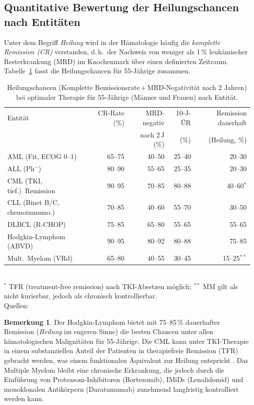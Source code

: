 ﻿\documentclass[12pt,a4paper]{article}
\theoremstyle{definition}
\newtheorem{remark}[theorem]{Bemerkung}
\begin{document}
\subsection{Quantitative Bewertung der Heilungschancen nach Entitäten}

Unter dem Begriff \emph{Heilung} wird in der Hämatologie häufig die
\emph{komplette Remission (CR)} verstanden, d.\,h.\ der Nachweis von weniger als
1\,\% leukämischer Resterkrankung (MRD) im Knochenmark über einen definierten
Zeitraum. Tabelle~\ref{tab:heilung} fasst die Heilungschancen für 55-Jährige
zusammen.

\begin{table}
\centering
\caption{Heilungschancen (Komplette Remissionsrate\,+\,MRD-Negativität nach
2 Jahren) bei optimaler Therapie für 55-Jährige (Männer und Frauen) nach Entität.}
\label{tab:heilung}
\begin{tabular}{@{}lrrrr@{}}
\toprule
Entität & CR-Rate (\%) & MRD-negativ & 10-J-ÜR & Remission dauerhaft \\
        &             & nach 2\,J (\%) & (\%) & (Heilung, \%) \\
\midrule
AML (Fit, ECOG 0--1)        & 65--75 & 40--50 & 25--40 & 20--30 \\
ALL (Ph$^{-}$)              & 80--90 & 55--65 & 25--35 & 20--30 \\
CML (TKI, tief.)\ Remission & 90--95 & 70--85 & 80--88 & 40--60$^*$ \\
CLL (Binet B/C, chemoimmuno.)& 70--85 & 40--60 & 55--70 & 30--50 \\
DLBCL (R-CHOP)              & 75--85 & 65--80 & 55--65 & 55--65 \\
Hodgkin-Lymphom (ABVD)      & 90--95 & 80--92 & 80--88 & 75--85 \\
Mult.\ Myelom (VRd)         & 65--80 & 40--55 & 30--45 & 15--25$^{**}$ \\
\bottomrule
\end{tabular}
\smallskip\\
\footnotesize $^*$ TFR (treatment-free remission) nach TKI-Absetzen möglich;
$^{**}$ MM gilt als nicht kurierbar, jedoch als chronisch kontrollierbar.\\
Quellen: \cite{dohner2017,kantarjian2021,hochhaus2017,zenz2014,coiffier2002,palumbo2011,burnett2007}
\end{table}

\begin{remark}
  Der Hodgkin-Lymphom bietet mit 75--85\,\% dauerhafter Remission (\emph{Heilung}
  im engeren Sinne) die besten Chancen unter allen hämatologischen Malignitäten
  für 55-Jährige. Die CML kann unter TKI-Therapie in einem substanziellen Anteil
  der Patienten in therapiefreie Remission (TFR) gebracht werden, was einem
  funktionalen Äquivalent zur Heilung entspricht \cite{hochhaus2017}.
  Das Multiple Myelom bleibt eine chronische Erkrankung, die jedoch durch
  die Einführung von Proteasom-Inhibitoren (Bortezomib), IMiDs (Lenalidomid)
  und monoklonalen Antikörpern (Daratumumab) zunehmend langfristig kontrolliert
  werden kann.
\end{remark}
\end{document}
